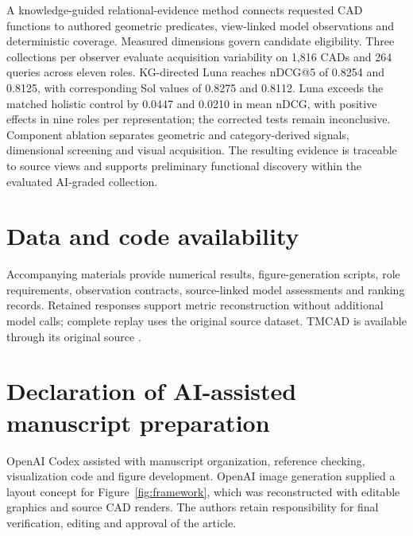 \documentclass[10pt,a4paper,twocolumn]{article}
\begin{document}
A knowledge-guided relational-evidence method connects requested CAD functions
to authored geometric predicates, view-linked model observations and deterministic
coverage. Measured dimensions govern candidate eligibility. Three collections per
observer evaluate acquisition variability on 1,816 CADs and 264 queries across
eleven roles. KG-directed Luna reaches nDCG@5 of 0.8254 and 0.8125, with corresponding Sol values of 0.8275 and 0.8112. Luna exceeds the matched holistic control by 0.0447 and 0.0210 in mean nDCG, with positive effects in nine roles per representation; the corrected tests remain inconclusive. Component ablation separates geometric and category-derived
signals, dimensional screening and visual acquisition. The resulting evidence is
traceable to source views and supports preliminary functional discovery within
the evaluated AI-graded collection.

\section*{Data and code availability}
Accompanying materials provide numerical results, figure-generation scripts,
role requirements, observation contracts, source-linked model assessments and
ranking records. Retained responses support metric reconstruction without
additional model calls; complete replay uses the original source dataset.
TMCAD is available through its original source \cite{zou2025brt}.

\section*{Declaration of AI-assisted manuscript preparation}
OpenAI Codex assisted with manuscript organization, reference checking,
visualization code and figure development. OpenAI image generation supplied a
layout concept for Figure~\ref{fig:framework}, which was reconstructed with
editable graphics and source CAD renders. The authors retain responsibility
for final verification, editing and approval of the article.

\par\vspace{6pt}
{\fontsize{7.5}{8.7}\selectfont
{}

}
\end{document}
